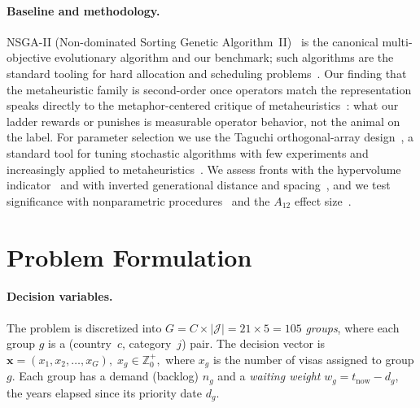 \documentclass[runningheads]{llncs}
\begin{document}
\paragraph{Baseline and methodology.}
NSGA-II (Non-dominated Sorting Genetic Algorithm~II)~\cite{deb} is the canonical multi-objective evolutionary algorithm and our benchmark; such algorithms are the standard tooling for hard allocation and scheduling problems~\cite{zhang}. Our finding that the metaheuristic family is second-order once operators match the representation speaks directly to the metaphor-centered critique of metaheuristics~\cite{aranha,sorensen}: what our ladder rewards or punishes is measurable operator behavior, not the animal on the label. For parameter selection we use the Taguchi orthogonal-array design~\cite{montgomery}, a standard tool for tuning stochastic algorithms with few experiments and increasingly applied to metaheuristics~\cite{alrafei}. We assess fronts with the hypervolume indicator~\cite{zitzler} and with inverted generational distance and spacing~\cite{coello}, and we test significance with nonparametric procedures~\cite{derrac} and the $A_{12}$ effect size~\cite{vargha}.

\section{Problem Formulation}
\label{sec:formulation}

\paragraph{Decision variables.}
The problem is discretized into $G = C \times |\mathcal{J}| = 21 \times 5 = 105$ \emph{groups}, where each group $g$ is a (country~$c$, category~$j$) pair. The decision vector is
\(
\mathbf{x} = (x_1, x_2, \dots, x_G),\; x_g \in \mathbb{Z}^{+}_0,
\)
where $x_g$ is the number of visas assigned to group $g$. Each group has a demand (backlog) $n_g$ and a \emph{waiting weight} $w_g = t_{\text{now}} - d_g$, the years elapsed since its priority date $d_g$.
\end{document}
